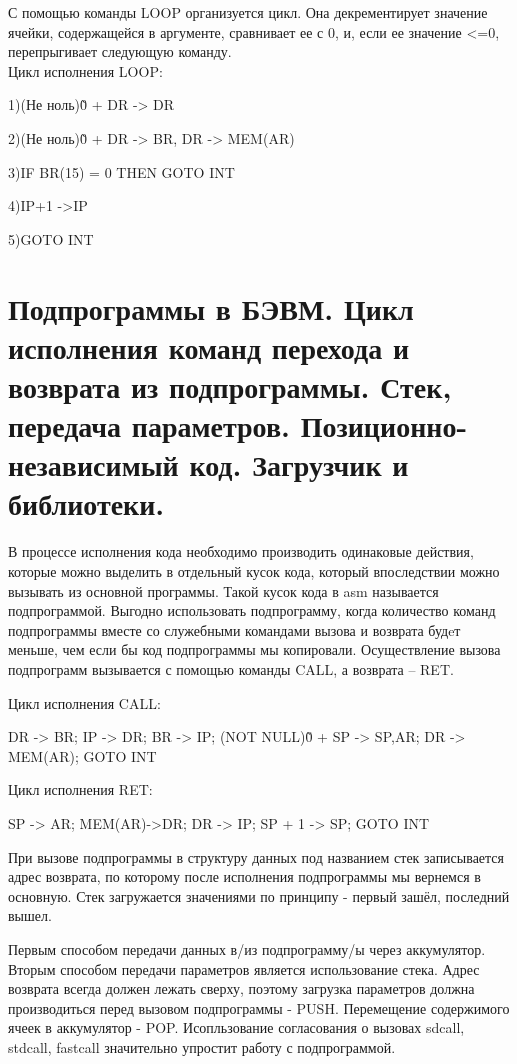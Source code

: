 \documentclass{article}
\begin{document}
С помощью команды LOOP организуется цикл. Она декрементирует значение ячейки, содержащейся в аргументе, сравнивает ее с 0, 
и, если ее значение <=0, перепрыгивает следующую команду.\\
Цикл исполнения LOOP:


1)(Не ноль)\~ 0 + DR -> DR


2)(Не ноль)\~ 0 + DR -> BR, DR -> MEM(AR)


3)IF BR(15) = 0 THEN GOTO INT


4)IP+1 ->IP


5)GOTO INT





\section{Подпрограммы в БЭВМ. Цикл исполнения команд перехода и возврата из подпрограммы. Стек, передача параметров. Позиционно-независимый код. Загрузчик и библиотеки.}
В процессе исполнения кода необходимо производить одинаковые действия, 
которые можно выделить в отдельный кусок кода, который впоследствии можно вызывать из основной программы. 
Такой кусок кода в asm называется подпрограммой. Выгодно использовать подпрограмму, 
когда количество команд подпрограммы вместе со служебными командами вызова и возврата будeт меньше, 
чем если бы код подпрограммы мы копировали. Осуществление вызова подпрограмм вызывается с помощью команды CALL, а возврата – RET. 


Цикл исполнения CALL:


DR -> BR; IP -> DR; BR -> IP; (NOT NULL)\~0 + SP -> SP,AR; DR -> MEM(AR); GOTO INT


Цикл исполнения RET:


SP -> AR; MEM(AR)->DR; DR -> IP; SP + 1 -> SP; GOTO INT


При вызове подпрограммы в структуру данных под названием стек записывается адрес возврата, по которому после исполнения подпрограммы мы вернемся в основную. 
Стек загружается значениями по принципу - первый зашёл, последний вышел.


Первым способом передачи данных в/из подпрограмму/ы через аккумулятор. 
Вторым способом передачи параметров является использование стека. Адрес возврата всегда должен лежать сверху, поэтому загрузка параметров должна производиться перед вызовом подпрограммы - PUSH. 
Перемещение содержимого ячеек в аккумулятор - POP. Исопльзование согласования о вызовах sdcall, stdcall, fastcall значительно упростит работу с подпрограммой.
\end{document}

